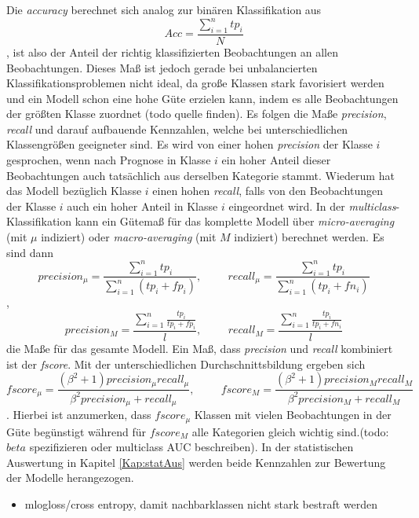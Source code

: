 \documentclass[a4paper,11pt]{article}
\begin{document}
Die \textit{accuracy} berechnet sich analog zur binären Klassifikation aus 
\[ Acc = \frac{\sum_{i=1}^n tp_i}{N} \],
ist also der Anteil der richtig klassifizierten Beobachtungen an allen Beobachtungen. Dieses Maß ist jedoch gerade bei unbalancierten Klassifikationsproblemen nicht ideal, da große Klassen stark favorisiert werden und ein Modell schon eine hohe Güte erzielen kann, indem es alle Beobachtungen der größten Klasse zuordnet (todo quelle finden). Es folgen die Maße \textit{precision}, \textit{recall} und darauf aufbauende Kennzahlen, welche bei unterschiedlichen Klassengrößen geeigneter sind. Es wird von einer hohen \textit{precision} der Klasse $i$gesprochen, wenn nach Prognose in Klasse $i$ ein hoher Anteil dieser Beobachtungen auch tatsächlich aus derselben Kategorie stammt. Wiederum hat das Modell bezüglich Klasse $i$ einen hohen \textit{recall}, falls von den Beobachtungen der Klasse $i$ auch ein hoher Anteil in Klasse $i$ eingeordnet wird.
In der \textit{multiclass}-Klassifikation kann ein Gütemaß für das komplette Modell über \textit{micro-averaging} (mit $\mu$ indiziert) oder \textit{macro-averaging} (mit $M$ indiziert) berechnet werden. Es sind dann 
\[ precision_{\mu} = \frac{\sum_{i = 1}^n tp_i}{\sum_{i = 1}^n (tp_i + fp_i)}, \hspace{1cm} recall_{\mu} = \frac{\sum_{i = 1}^n tp_i}{\sum_{i = 1}^n (tp_i + fn_i)}\],
\[ precision_M = \frac{\sum_{i = 1}^n \frac{tp_i}{tp_i + fp_i} }{l}, \hspace{1cm} recall_M = \frac{\sum_{i = 1}^n \frac{tp_i}{tp_i + fn_i} }{l}\]
die Maße für das gesamte Modell. Ein Maß, dass \textit{precision} und \textit{recall} kombiniert ist der \textit{fscore}. Mit der unterschiedlichen Durchschnittsbildung ergeben sich
\[ fscore_{\mu} = \frac{(\beta^2+1) precision_{\mu} recall_{\mu}}{\beta^2 precision_{\mu}+ recall_{\mu}}, \hspace{1cm} fscore_{M} = \frac{(\beta^2+1) precision_{M} recall_{M}}{\beta^2 precision_{M}+ recall_{M}} \].
Hierbei ist anzumerken, dass $fscore_{\mu}$ Klassen mit vielen Beobachtungen in der Güte begünstigt während für $fscore_M$ alle Kategorien gleich wichtig sind.(todo: $beta$ spezifizieren oder multiclass AUC beschreiben).  In der statistischen Auswertung in Kapitel \ref{Kap:statAus} werden beide Kennzahlen zur Bewertung der Modelle herangezogen.

\begin{itemize}
    \item mlogloss/cross entropy, damit nachbarklassen nicht stark bestraft werden
\end{itemize}{}
\end{document}
